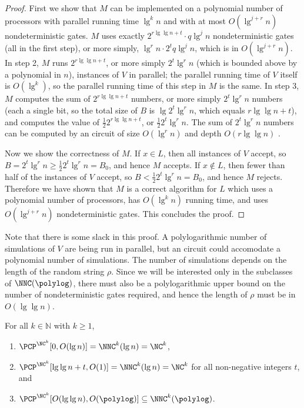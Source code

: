 \documentclass[]{article}
\begin{document}
\begin{proof}
  First we show that $M$ can be implemented on a polynomial number of processors with parallel running time $\lg^k n$ and with at most $O(\lg^{j + r} n)$ nondeterministic gates.
  $M$ uses exactly $2^{r \lg \lg n + t}\cdot q \lg^j n$ nondeterministic gates (all in the first step), or more simply, $\lg^r n \cdot 2^t q \lg^j n$, which is in $O(\lg^{j + r} n)$.
  In step 2, $M$ runs $2^{r \lg \lg n + t}$, or more simply $2^t \lg^r n$ (which is bounded above by a polynomial in $n$), instances of $V$ in parallel; the parallel running time of $V$ itself is $O(\lg^k)$, so the parallel running time of this step in $M$ is the same.
  In step 3, $M$ computes the sum of $2^{r \lg \lg n + t}$ numbers, or more simply $2^t \lg^r n$ numbers (each a single bit, so the total size of $B$ is $\lg 2^t \lg^r n$, which equals $r \lg \lg n + t$), and computes the value of $\frac{1}{2} 2^{r \lg \lg n + t}$, or $\frac{1}{2} 2^t \lg^r n$.
  The sum of $2^t \lg^r n$ numbers can be computed by an \NC{} circuit of size $O(\lg^r n)$ and depth $O(r \lg \lg n)$ \cite[Theorem~2.6.1]{savage98}.

  Now we show the correctness of $M$.
  If $x \in L$, then all instances of $V$ accept, so $B = 2^t \lg^r n \geq \frac{1}{2} 2^t \lg^r n = B_0$, and hence $M$ accepts.
  If $x \notin L$, then fewer than half of the instances of $V$ accept, so $B < \frac{1}{2} 2^t \lg^r n = B_0$, and hence $M$ rejects.
  Therefore we have shown that $M$ is a correct algorithm for $L$ which uses a polynomial number of processors, has $O(\lg^k n)$ running time, and uses $O(\lg^{j + r} n)$ nondeterministic gates.
  This concludes the proof.
\end{proof}

Note that there is some slack in this proof.
A polylogarithmic number of simulations of $V$ are being run in parallel, but an \NNC{} circuit could accomodate a polynomial number of simulations.
The number of simulations depends on the length of the random string $\rho$.
Since we will be interested only in the subclasses of $\NNC(\polylog)$, there must also be a polylogarithmic upper bound on the number of nondeterministic gates required, and hence the length of $\rho$ must be in $O(\lg \lg n)$.

\begin{corollary}\label{cor:pcpinnnck}
  For all $k \in \mathbb{N}$ with $k \geq 1$,
  \begin{enumerate}
  \item $\PCP^{\NC^k}[0, O(\lg n)] = \NNC^k(\lg n) = \NC^k$,
  \item $\PCP^{\NC^k}[\lg \lg n + t, O(1)] = \NNC^k(\lg n) = \NC^k$ for all non-negative integers $t$, and
  \item $\PCP^{\NC^k}[O(\lg \lg n), O(\polylog)] \subseteq \NNC^k(\polylog)$.
  \end{enumerate}
\end{corollary}
\end{document}
